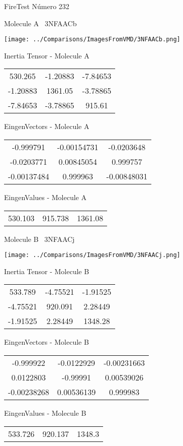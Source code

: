 \vtab[-3cm]
\begin{center}
{\large FireTest \tab Número 232}
\end{center}
\begin{multicols}{2}
\begin{center}

Molecule A \
3NFAACb

\texttt{[image: ../Comparisons/ImagesFromVMD/3NFAACb.png]}

Inertia Tensor - Molecule A \\
\begin{tabular}{|c c c|}
530.265	 & 	-1.20883	 & 	-7.84653	 \\
-1.20883	 & 	1361.05	 & 	-3.78865	 \\
-7.84653	 & 	-3.78865	 & 	915.61
\end{tabular}

\vtab
 EingenVectors - Molecule A     \\
\begin{tabular}{|c c c|}
-0.999791	 & 	-0.00154731	 & 	-0.0203648	 \\
-0.0203771	 & 	0.00845054	 & 	0.999757	 \\
-0.00137484	 & 	0.999963	 & 	-0.00848031
\end{tabular}

\vtab
 EingenValues - Molecule A     \\
\begin{tabular}{|c c c|}
530.103	 & 	915.738	 & 	1361.08	 \\
\end{tabular}
\columnbreak

Molecule B \
3NFAACj

\texttt{[image: ../Comparisons/ImagesFromVMD/3NFAACj.png]}

Inertia Tensor - Molecule B \\
\begin{tabular}{|c c c|}
533.789	 & 	-4.75521	 & 	-1.91525	 \\
-4.75521	 & 	920.091	 & 	2.28449	 \\
-1.91525	 & 	2.28449	 & 	1348.28
\end{tabular}

\vtab
 EingenVectors - Molecule B     \\
\begin{tabular}{|c c c|}
-0.999922	 & 	-0.0122929	 & 	-0.00231663	 \\
0.0122803	 & 	-0.99991	 & 	0.00539026	 \\
-0.00238268	 & 	0.00536139	 & 	0.999983
\end{tabular}

\vtab
 EingenValues - Molecule B     \\
\begin{tabular}{|c c c|}
533.726	 & 	920.137	 & 	1348.3	 \\
\end{tabular}

\end{center}
\end{multicols}


